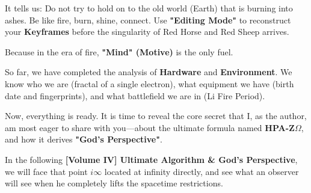 It tells us:
Do not try to hold on to the old world (Earth) that is burning into ashes.
Be like fire, burn, shine, connect.
Use \textbf{"Editing Mode"} to reconstruct your \textbf{Keyframes} before the singularity of Red Horse and Red Sheep arrives.

Because in the era of fire, \textbf{"Mind" (Motive)} is the only fuel.

So far, we have completed the analysis of \textbf{Hardware} and \textbf{Environment}. We know who we are (fractal of a single electron), what equipment we have (birth date and fingerprints), and what battlefield we are in (Li Fire Period).

Now, everything is ready. It is time to reveal the core secret that I, as the author, am most eager to share with you—about the ultimate formula named \textbf{HPA-Z$\Omega$}, and how it derives \textbf{"God's Perspective"}.

In the following \textbf{[Volume IV] Ultimate Algorithm \& God's Perspective}, we will face that point $i\infty$ located at infinity directly, and see what an observer will see when he completely lifts the spacetime restrictions.

